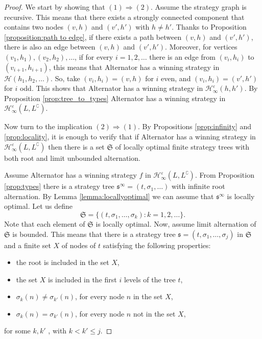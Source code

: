 \begin{proof}
We start by showing that $(1) \Rightarrow (2)$. Assume the strategy graph is recursive. This means that there exists a strongly connected component that contains two nodes $(v, h)$ and $(v', h')$ with $h \neq h'$. 
Thanks to Proposition \ref{proposition:path to edge}, if there exists a path between $(v, h)$ and $(v', h')$, there is also an edge between $(v, h)$ and $(v', h')$. 
Moreover, for vertices $(v_1,h_1),(v_2,h_2),\dots$, if for every $i=1,2,\dots$ there is an edge from $(v_i, h_i)$ to $(v_{i+1}, h_{i+1})$, this means that Alternator has a winning strategy in $\mathcal{H}(h_1,h_2,\dots)$. So, take $(v_i, h_i)= (v,h)$ for $i$ even, and $(v_i, h_i)= (v',h')$ for $i$ odd. This shows that Alternator has a winning strategy in $\mathcal{H}^\varepsilon_\infty(h, h')$. By Proposition \ref{prop:tree_to_types}
Alternator has a winning strategy in  $\mathcal{H}^\varepsilon_\infty(L, L^\complement)$.


Now turn to the implication  $(2) \Rightarrow (1)$. 
By Propositions \ref{prop:infinity}  and \ref{prop:locality}, it is enough to verify that 
 if Alternator has a winning strategy in $\mathcal{H}^\varepsilon_\infty(L, L^\complement)$ then there is a set $\mathfrak{S}$ of locally optimal finite strategy trees  with both root and limit unbounded alternation. 
 
Assume Alternator has a winning strategy $f$ in  $\mathcal{H}^\varepsilon_\infty(L, L^\complement)$. From Proposition \ref{prop:types} there is a strategy tree $\mathfrak{s}^\infty = (t,\sigma_1,\dots) $ with infinite root alternation. 
 By Lemma \ref{lemma:locallyoptimal} we can assume that $\mathfrak{s}^\infty$ is  locally optimal. Let us define 
\[ \mathfrak{S}= \{ (t,\sigma_1,\dots,\sigma_k): k=1,2,\dots\}. \]
Note that each element of $\mathfrak{S}$ is locally optimal.
Now, assume limit alternation of $\mathfrak{S}$ is bounded.
This means that there is a strategy tree $\mathfrak{s}=(t, \sigma_1, \dots, \sigma_j)$ in  $ \mathfrak{S}$ and a finite set $X$ of nodes of $t$ satisfying the following properties:
\begin{itemize}
\item the root is included in the set $X$,
\item the set $X$ is included in the first $i$ levels of the tree $t$, 
\item $\sigma_k(n)\neq \sigma_{k'}(n)$, for every node $n$ in the set $X$,
\item $\sigma_k(n)= \sigma_{k'}(n)$, for every node $n$ not in the set $X$,
\end{itemize}
for some $k, k'$ , with $k < k' \leq j$.


\end{proof}
